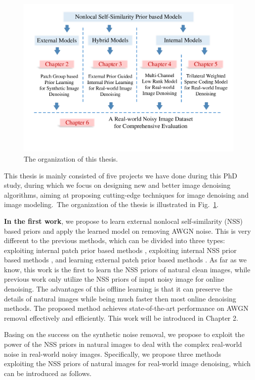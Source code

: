 \begin{figure}[t!]
\centering
\includegraphics[width=1\linewidth]{images/ThesisOrganization.pdf}
\vspace{-20mm}
\caption{The organization of this thesis.}
\label{fig1-1}
\end{figure}

This thesis is mainly consisted of five projects we have done during this PhD study, during which we focus on designing new and better image denoising algorithms, aiming at proposing cutting-edge techniques for image denoising and image modeling.\ The organization of the thesis is illustrated in Fig.\ \ref{fig1-1}.

\textbf{In the first work}, we propose to learn external nonlocal self-similarity (NSS) based priors and apply the learned model on removing AWGN noise. This is very different to the previous methods, which can be divided into three types: exploiting internal patch prior based methods \cite{ksvd,ple}, exploiting internal NSS prior based methods \cite{bm3d,lssc,ncsr,wnnm}, and learning external patch prior based methods \cite{epll}. As far as we know, this work is the first to learn the NSS priors of natural clean images, while previous work only utilize the NSS priors of input noisy image for online denoising. The advantages of this offline learning is that it can preserve the details of natural images while being much faster then most online denoising methods. The proposed method achieves state-of-the-art performance on AWGN removal effectively and efficiently. This work will be introduced in Chapter 2.

Basing on the success on the synthetic noise removal, we propose to exploit the power of the NSS priors in natural images to deal with the complex real-world noise in real-world noisy images. Specifically, we propose three methods exploiting the NSS priors of natural images for real-world image denoising, which can be introduced as follows.

